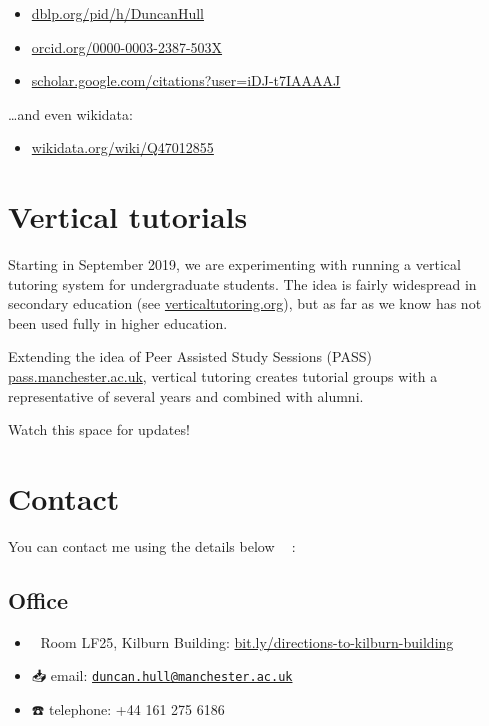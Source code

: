 \documentclass[12pt,]{book}
\providecommand{\tightlist}{%
  \setlength{\itemsep}{0pt}\setlength{\parskip}{0pt}}
\begin{document}
\begin{itemize}
\tightlist
\item
  \href{https://dblp.org/pid/h/DuncanHull}{dblp.org/pid/h/DuncanHull}
\item
  \href{https://orcid.org/0000-0003-2387-503X}{orcid.org/0000-0003-2387-503X}
\item
  \href{https://scholar.google.com/citations?user=iDJ-t7IAAAAJ}{scholar.google.com/citations?user=iDJ-t7IAAAAJ}
\end{itemize}

\ldots{}and even wikidata:

\begin{itemize}
\tightlist
\item
  \href{https://www.wikidata.org/wiki/Q47012855}{wikidata.org/wiki/Q47012855}
\end{itemize}

\hypertarget{vertical-tutorials}{%
\chapter{Vertical tutorials}\label{vertical-tutorials}}

Starting in September 2019, we are experimenting with running a vertical tutoring system for undergraduate students. The idea is fairly widespread in secondary education (see \href{https://www.verticaltutoring.org/}{verticaltutoring.org}), but as far as we know has not been used fully in higher education.

Extending the idea of Peer Assisted Study Sessions (PASS) \href{http://www.pass.manchester.ac.uk}{pass.manchester.ac.uk}, vertical tutoring creates tutorial groups with a representative of several years and combined with alumni.

Watch this space for updates!

\hypertarget{contact}{%
\chapter{Contact}\label{contact}}

You can contact me using the details below 👨‍💻 :

\hypertarget{office}{%
\section{Office}\label{office}}

\begin{itemize}
\tightlist
\item
  🏢 Room LF25, Kilburn Building: \href{http://bit.ly/directions-to-kilburn-building}{bit.ly/directions-to-kilburn-building}
\item
  📥 email: \href{mailto:duncan.hull@manchester.ac.uk}{\nolinkurl{duncan.hull@manchester.ac.uk}}
\item
  ☎️ telephone: +44 161 275 6186
\end{itemize}
\end{document}
